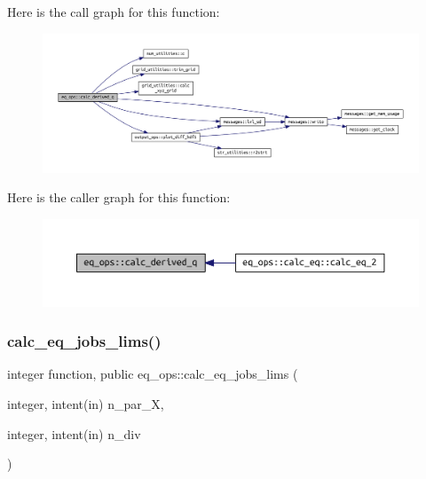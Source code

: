Here is the call graph for this function\+:\nopagebreak
\begin{figure}[H]
\begin{center}
\leavevmode
\includegraphics[width=350pt]{namespaceeq__ops_a087e08ce6d8ad381b5bac8fc51148d50_cgraph}
\end{center}
\end{figure}
Here is the caller graph for this function\+:\nopagebreak
\begin{figure}[H]
\begin{center}
\leavevmode
\includegraphics[width=350pt]{namespaceeq__ops_a087e08ce6d8ad381b5bac8fc51148d50_icgraph}
\end{center}
\end{figure}
\mbox{\label{namespaceeq__ops_a4e20b8725fce149449f83754244dc84e}} 
\subsubsection{\texorpdfstring{calc\+\_\+eq\+\_\+jobs\+\_\+lims()}{calc\_eq\_jobs\_lims()}}
{\footnotesize\ttfamily integer function, public eq\+\_\+ops\+::calc\+\_\+eq\+\_\+jobs\+\_\+lims (\begin{DoxyParamCaption}\item[{integer, intent(in)}]{n\+\_\+par\+\_\+X,  }\item[{integer, intent(in)}]{n\+\_\+div }\end{DoxyParamCaption})}



